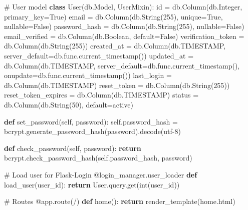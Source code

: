 \documentclass[
  letterpaper,
  DIV=11,
  numbers=noendperiod]{scrreprt}
\newenvironment{Shaded}{\begin{snugshade}}{\end{snugshade}}
\newcommand{\AttributeTok}[1]{\textcolor[rgb]{0.40,0.45,0.13}{#1}}
\newcommand{\BuiltInTok}[1]{\textcolor[rgb]{0.00,0.23,0.31}{#1}}
\newcommand{\CommentTok}[1]{\textcolor[rgb]{0.37,0.37,0.37}{#1}}
\newcommand{\ControlFlowTok}[1]{\textcolor[rgb]{0.00,0.23,0.31}{\textbf{#1}}}
\newcommand{\DecValTok}[1]{\textcolor[rgb]{0.68,0.00,0.00}{#1}}
\newcommand{\KeywordTok}[1]{\textcolor[rgb]{0.00,0.23,0.31}{\textbf{#1}}}
\newcommand{\NormalTok}[1]{\textcolor[rgb]{0.00,0.23,0.31}{#1}}
\newcommand{\OperatorTok}[1]{\textcolor[rgb]{0.37,0.37,0.37}{#1}}
\newcommand{\StringTok}[1]{\textcolor[rgb]{0.13,0.47,0.30}{#1}}
\newcommand{\VariableTok}[1]{\textcolor[rgb]{0.07,0.07,0.07}{#1}}
\begin{document}
\begin{Shaded}
\begin{Highlighting}[]
\CommentTok{\# User model}
\KeywordTok{class}\NormalTok{ User(db.Model, UserMixin):}
    \BuiltInTok{id} \OperatorTok{=}\NormalTok{ db.Column(db.Integer, primary\_key}\OperatorTok{=}\VariableTok{True}\NormalTok{)}
\NormalTok{    email }\OperatorTok{=}\NormalTok{ db.Column(db.String(}\DecValTok{255}\NormalTok{), unique}\OperatorTok{=}\VariableTok{True}\NormalTok{, nullable}\OperatorTok{=}\VariableTok{False}\NormalTok{)}
\NormalTok{    password\_hash }\OperatorTok{=}\NormalTok{ db.Column(db.String(}\DecValTok{255}\NormalTok{), nullable}\OperatorTok{=}\VariableTok{False}\NormalTok{)}
\NormalTok{    email\_verified }\OperatorTok{=}\NormalTok{ db.Column(db.Boolean, default}\OperatorTok{=}\VariableTok{False}\NormalTok{)}
\NormalTok{    verification\_token }\OperatorTok{=}\NormalTok{ db.Column(db.String(}\DecValTok{255}\NormalTok{))}
\NormalTok{    created\_at }\OperatorTok{=}\NormalTok{ db.Column(db.TIMESTAMP, server\_default}\OperatorTok{=}\NormalTok{db.func.current\_timestamp())}
\NormalTok{    updated\_at }\OperatorTok{=}\NormalTok{ db.Column(db.TIMESTAMP, server\_default}\OperatorTok{=}\NormalTok{db.func.current\_timestamp(), onupdate}\OperatorTok{=}\NormalTok{db.func.current\_timestamp())}
\NormalTok{    last\_login }\OperatorTok{=}\NormalTok{ db.Column(db.TIMESTAMP)}
\NormalTok{    reset\_token }\OperatorTok{=}\NormalTok{ db.Column(db.String(}\DecValTok{255}\NormalTok{))}
\NormalTok{    reset\_token\_expires }\OperatorTok{=}\NormalTok{ db.Column(db.TIMESTAMP)}
\NormalTok{    status }\OperatorTok{=}\NormalTok{ db.Column(db.String(}\DecValTok{50}\NormalTok{), default}\OperatorTok{=}\StringTok{\textquotesingle{}active\textquotesingle{}}\NormalTok{)}

    \KeywordTok{def}\NormalTok{ set\_password(}\VariableTok{self}\NormalTok{, password):}
        \VariableTok{self}\NormalTok{.password\_hash }\OperatorTok{=}\NormalTok{ bcrypt.generate\_password\_hash(password).decode(}\StringTok{\textquotesingle{}utf{-}8\textquotesingle{}}\NormalTok{)}

    \KeywordTok{def}\NormalTok{ check\_password(}\VariableTok{self}\NormalTok{, password):}
        \ControlFlowTok{return}\NormalTok{ bcrypt.check\_password\_hash(}\VariableTok{self}\NormalTok{.password\_hash, password)}

\CommentTok{\# Load user for Flask{-}Login}
\AttributeTok{@login\_manager.user\_loader}
\KeywordTok{def}\NormalTok{ load\_user(user\_id):}
    \ControlFlowTok{return}\NormalTok{ User.query.get(}\BuiltInTok{int}\NormalTok{(user\_id))}

\CommentTok{\# Routes}
\AttributeTok{@app.route}\NormalTok{(}\StringTok{\textquotesingle{}/\textquotesingle{}}\NormalTok{)}
\KeywordTok{def}\NormalTok{ home():}
    \ControlFlowTok{return}\NormalTok{ render\_template(}\StringTok{\textquotesingle{}home.html\textquotesingle{}}\NormalTok{)}


\end{Highlighting}
\end{Shaded}
\end{document}
